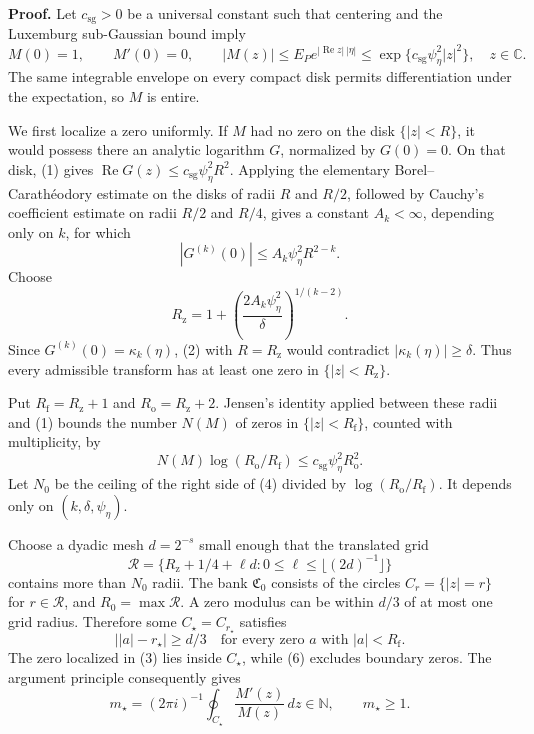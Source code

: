 \textbf{Proof.}
Let \(c_{\mathrm{sg}}>0\) be a universal constant such that centering and the Luxemburg sub-Gaussian bound imply
\[
 M(0)=1,\qquad M'(0)=0,\qquad
 |M(z)|\le E_Pe^{|\operatorname{Re}z|\,|\eta|}
 \le \exp\{c_{\mathrm{sg}}\psi_\eta^2|z|^2\},
 \quad z\in\mathbb C. \tag{1}
\]
The same integrable envelope on every compact disk permits differentiation under the expectation, so \(M\) is entire.

We first localize a zero uniformly. If \(M\) had no zero on the disk \(\{|z|<R\}\), it would possess there an analytic logarithm \(G\), normalized by \(G(0)=0\). On that disk, (1) gives \(\operatorname{Re}G(z)\le c_{\mathrm{sg}}\psi_\eta^2R^2\). Applying the elementary Borel--Carath\'eodory estimate on the disks of radii \(R\) and \(R/2\), followed by Cauchy's coefficient estimate on radii \(R/2\) and \(R/4\), gives a constant \(A_k<\infty\), depending only on \(k\), for which
\[
 |G^{(k)}(0)|\le A_k\psi_\eta^2R^{2-k}. \tag{2}
\]
Choose
\[
 R_{\mathrm z}=1+\left(\frac{2A_k\psi_\eta^2}{\delta}\right)^{1/(k-2)}. \tag{3}
\]
Since \(G^{(k)}(0)=\kappa_k(\eta)\), (2) with \(R=R_{\mathrm z}\) would contradict \(|\kappa_k(\eta)|\ge\delta\). Thus every admissible transform has at least one zero in \(\{|z|<R_{\mathrm z}\}\).

Put \(R_{\mathrm f}=R_{\mathrm z}+1\) and \(R_{\mathrm o}=R_{\mathrm z}+2\). Jensen's identity applied between these radii and (1) bounds the number \(N(M)\) of zeros in \(\{|z|<R_{\mathrm f}\}\), counted with multiplicity, by
\[
 N(M)\log(R_{\mathrm o}/R_{\mathrm f})
 \le c_{\mathrm{sg}}\psi_\eta^2R_{\mathrm o}^2. \tag{4}
\]
Let \(N_0\) be the ceiling of the right side of (4) divided by \(\log(R_{\mathrm o}/R_{\mathrm f})\). It depends only on \((k,\delta,\psi_\eta)\).

Choose a dyadic mesh \(d=2^{-s}\) small enough that the translated grid
\[
 \mathcal R=\{R_{\mathrm z}+1/4+\ell d:
 0\le \ell\le \lfloor(2d)^{-1}\rfloor\} \tag{5}
\]
contains more than \(N_0\) radii. The bank \(\mathfrak C_0\) consists of the circles \(C_r=\{|z|=r\}\) for \(r\in\mathcal R\), and \(R_0=\max\mathcal R\). A zero modulus can be within \(d/3\) of at most one grid radius. Therefore some \(C_\star=C_{r_\star}\) satisfies
\[
 \bigl||a|-r_\star\bigr|\ge d/3
 \quad\text{for every zero }a\text{ with }|a|<R_{\mathrm f}. \tag{6}
\]
The zero localized in (3) lies inside \(C_\star\), while (6) excludes boundary zeros. The argument principle consequently gives
\[
 m_\star=(2\pi i)^{-1}\oint_{C_\star}\frac{M'(z)}{M(z)}\,dz
 \in\mathbb N,\qquad m_\star\ge1. \tag{7}
\]

